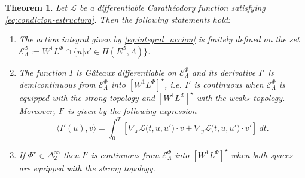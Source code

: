 \documentclass[twoside]{article}
\newtheorem{thm}{Theorem}[section]
\theoremstyle{remark}
\newcommand{\lphi}{L^{\Phi}}
\newcommand{\ephi}{E^{\Phi}}
\newcommand{\wphi}{W^{1}\lphi}
\newcommand{\domi}{\mathcal{E}^{\Phi}}
\begin{document}
\begin{thm}\label{teo:diferenciabilidad}
Let $\mathcal{L}$ be a differentiable Carath\'eodory function satisfying \eqref{eq:condicion-estructura}.
Then the following statements hold:
\begin{enumerate}
\item \label{it:T1item1} \label{A1} The action integral given by \eqref{eq:integral_accion}
is finitely defined on the set $\domi_{\Lambda}:=W^{1}\lphi\cap\{u|u'\in\Pi(\ephi,\Lambda)\}$.

\item\label{it:T1item3} The function  $I$ is G\^ateaux differentiable on $\domi_{\Lambda}$ and  its derivative $I'$ is demicontinuous from 
$\domi_{\Lambda}$  into $\left[\wphi \right]^{\star}$, i.e. $I'$ is continuous when $\domi_{\Lambda}$ is equipped with the strong topology and   $\left[\wphi \right]^{\star}$ with the weak${\star}$ topology. Moreover, $I'$ is given by the following expression
\begin{equation}\label{eq:DerAccion}
\langle  I'(u),v\rangle= \int_0^T \left[\nabla_x\mathcal{L}\big(t,u,u'\big)\cdot v
+ \nabla_y\mathcal{L}\big(t,u,u'\big)\cdot v'\right] \ dt.
\end{equation}

\item\label{it:T1item4}  If  $\Phi^{\star} \in \Delta^{\infty}_2$ then 
  $I'$ is continuous from $\domi_{\Lambda}$ into $\left[\wphi\right]^{\star}$ when both spaces are equipped with the strong topology.
\end{enumerate}
\end{thm}
\end{document}
